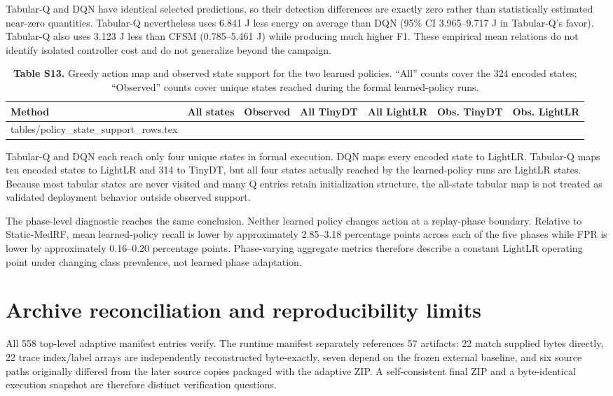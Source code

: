 \documentclass[10pt,a4paper]{article}
\makeatletter
\newcommand{\tableinput}[1]{\@@input #1.tex }
\makeatother
\begin{document}
Tabular-Q and DQN have identical selected predictions, so their detection differences are exactly zero rather than statistically estimated near-zero quantities. Tabular-Q nevertheless uses 6.841 J less energy on average than DQN (95\% CI 3.965--9.717 J in Tabular-Q's favor). Tabular-Q also uses 3.123 J less than CFSM (0.785--5.461 J) while producing much higher F1. These empirical mean relations do not identify isolated controller cost and do not generalize beyond the campaign.

\begin{table}[h!]
\centering\small
\caption*{\textbf{Table S13.} Greedy action map and observed state support for the two learned policies. ``All'' counts cover the 324 encoded states; ``Observed'' counts cover unique states reached during the formal learned-policy runs.}
\begin{tabular}{lrrrrrr}\toprule
Method & All states & Observed & All TinyDT & All LightLR & Obs. TinyDT & Obs. LightLR\\\midrule
\tableinput{tables/policy_state_support_rows}
\bottomrule\end{tabular}
\end{table}

Tabular-Q and DQN each reach only four unique states in formal execution. DQN maps every encoded state to LightLR. Tabular-Q maps ten encoded states to LightLR and 314 to TinyDT, but all four states actually reached by the learned-policy runs are LightLR states. Because most tabular states are never visited and many Q entries retain initialization structure, the all-state tabular map is not treated as validated deployment behavior outside observed support.

The phase-level diagnostic reaches the same conclusion. Neither learned policy changes action at a replay-phase boundary. Relative to Static-MedRF, mean learned-policy recall is lower by approximately 2.85--3.18 percentage points across each of the five phases while FPR is lower by approximately 0.16--0.20 percentage points. Phase-varying aggregate metrics therefore describe a constant LightLR operating point under changing class prevalence, not learned phase adaptation.

\section{Archive reconciliation and reproducibility limits}
All 558 top-level adaptive manifest entries verify. The runtime manifest separately references 57 artifacts: 22 match supplied bytes directly, 22 trace index/label arrays are independently reconstructed byte-exactly, seven depend on the frozen external baseline, and six source paths originally differed from the later source copies packaged with the adaptive ZIP. A self-consistent final ZIP and a byte-identical execution snapshot are therefore distinct verification questions.
\end{document}
